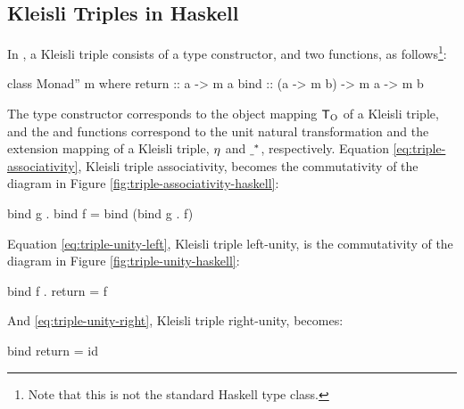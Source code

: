 \begin{example}
  \vspace{1em}
  \caseh{[]}
  \begin{steps}
    \steph{[]}
  \end{steps}
  \begin{steps}
      \eqbyih
      \eqbydefh{(++)}
  \end{steps}

\end{example}

\subsection{Kleisli Triples in Haskell}

In \hask, a Kleisli triple consists of a type constructor, and two
functions, as follows\footnote{Note that this is not the standard
  Haskell  type class.}:
\begin{codehaskell}
class Monad'' m where
  return :: a -> m a
  bind   :: (a -> m b) -> m a -> m b
\end{codehaskell}
The type constructor  corresponds to the object mapping
$\funcO{T}$ of a Kleisli triple, and the  and
 functions correspond to the unit natural
transformation and the extension mapping of a Kleisli triple,
$\nat{\eta}$ and $\monM{T}{\underscore}$, respectively. Equation
\eqref{eq:triple-associativity}, Kleisli triple associativity, becomes
the commutativity of the diagram in Figure
\ref{fig:triple-associativity-haskell}:
\begin{codehaskell}
bind g . bind f = bind (bind g . f)
\end{codehaskell}
Equation \eqref{eq:triple-unity-left}, Kleisli triple left-unity, is
the commutativity of the diagram in Figure
\ref{fig:triple-unity-haskell}:
\begin{codehaskell}
bind f . return = f
\end{codehaskell}
And \eqref{eq:triple-unity-right}, Kleisli triple right-unity,
becomes:
\begin{codehaskell}
bind return = id
\end{codehaskell}

